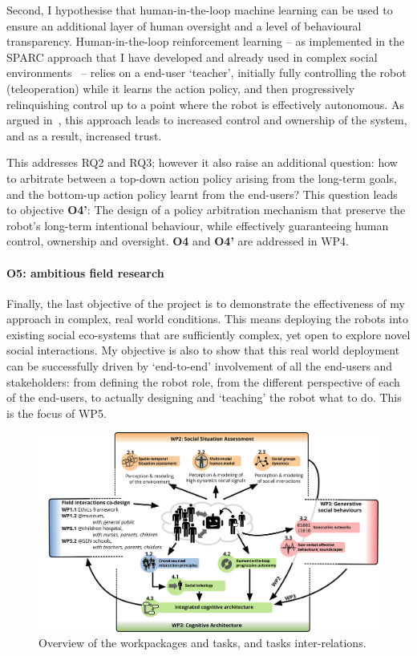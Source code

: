 Second, I hypothesise that human-in-the-loop machine learning can be used to
ensure an additional layer of human oversight and a level of behavioural
transparency.  Human-in-the-loop reinforcement learning -- as implemented in the SPARC
approach that I have developed and already used in complex social
environments~\cite{senft2017supervised, senft2019teaching, winkle2020couch} -- relies
on a end-user `teacher', initially fully controlling the robot (teleoperation)
while it learns the action policy, and then progressively relinquishing control
up to a point where the robot is effectively autonomous. As argued
in~\cite{senft2019teaching}, this approach leads to increased control and
ownership of the system, and as a result, increased trust.

This addresses RQ2 and RQ3; however it also raise an additional question: how to
arbitrate between a top-down action policy arising from the long-term goals, and
the bottom-up action policy learnt from the end-users? This question leads to
objective {\bf O4'}: The design of a policy arbitration mechanism that preserve
the robot's long-term intentional behaviour, while effectively guaranteeing human
control, ownership and oversight. {\bf O4} and {\bf O4'} are addressed in WP4.

\paragraph{\bf O5: ambitious field research} Finally, the last objective of the
\project project is to demonstrate the effectiveness of my approach in complex,
real world conditions. This means deploying the \project robots into existing
social eco-systems that are sufficiently complex, yet open to explore novel
social interactions. My objective is also to show that this real world
deployment can be successfully driven by `end-to-end' involvement of all the
end-users and stakeholders: from defining the robot role, from the different
perspective of each of the end-users, to actually designing and `teaching' the
robot what to do. This is the focus of WP5.


\begin{figure}[h!]
\centering
\includegraphics[width=\linewidth]{figs/wps}
\caption{Overview of the workpackages and tasks, and tasks inter-relations.}
\label{fig:wps}
\end{figure}

